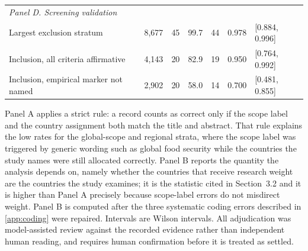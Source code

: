 \documentclass[ASNA,twocolumn]{USG}
\begin{document}
\begin{table}[t]
\begin{tabular*}{\textwidth}{@{\extracolsep\fill}l r r r r r l@{}}
\midrule
\multicolumn{7}{l}{\textit{Panel D. Screening validation}} \\
Largest exclusion stratum & 8,677 & 45 & 99.7 & 44 & 0.978 & [0.884, 0.996] \\
Inclusion, all criteria affirmative & 4,143 & 20 & 82.9 & 19 & 0.950 & [0.764, 0.992] \\
Inclusion, empirical marker not named & 2,902 & 20 & 58.0 & 14 & 0.700 & [0.481, 0.855] \\
\bottomrule
\end{tabular*}
\begin{tablenotes}
\item[] Panel A applies a strict rule: a record counts as correct only if the scope label and the country assignment both match the title and abstract. That rule explains the low rates for the global-scope and regional strata, where the scope label was triggered by generic wording such as global food security while the countries the study names were still allocated correctly. Panel B reports the quantity the analysis depends on, namely whether the countries that receive research weight are the countries the study examines; it is the statistic cited in Section~3.2 and it is higher than Panel A precisely because scope-label errors do not misdirect weight. Panel B is computed after the three systematic coding errors described in \ref{app:coding} were repaired. Intervals are Wilson intervals. All adjudication was model-assisted review against the recorded evidence rather than independent human reading, and requires human confirmation before it is treated as settled.
\end{tablenotes}
\end{table}
\end{document}
